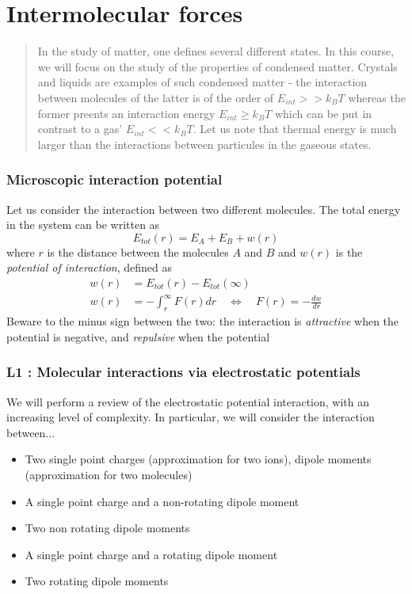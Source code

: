 \documentclass[../phys-f308.tex]{subfiles}
\begin{document}
    \part{Intermolecular forces}
    \begin{abstract}
        In the study of matter, one defines several different states. In this course, we will focus on the study of the properties of condensed matter. Crystals and liquids are examples of such condensed matter - the interaction between molecules of the latter is of the order of $E_{int}>> k_BT$ whereas the former preents an interaction energy $E_{int}\geq k_BT$ which can be put in contrast to a gas' $E_{int}<< k_BT$. Let us note that thermal energy is much larger than the interactions between particules in the gaseous states. 
    \end{abstract}

    \section{Microscopic interaction potential}

    Let us consider the interaction between two different molecules. The total energy in the system can be written as
    \begin{equation}
        E_{tot}(r) = E_A+E_B+w(r)
    \end{equation}
    where $r$ is the distance between the molecules $A$ and $B$ and $w(r)$ is the \emph{potential of interaction}, defined as
    \begin{align}
        w(r) &= E_{tot}(r) - E_{tot}(\infty)\\
        w(r) &= -\int_r^{\infty}F(r)dr \quad \Leftrightarrow \quad F(r) = -\frac{dw}{dr}\label{eq: F dw/dr}
    \end{align}
    Beware to the minus sign between the two: the interaction is \emph{attractive} when the potential is negative, and \emph{repulsive} when the potential   

    \section{L1 : Molecular interactions via electrostatic potentials}

    We will perform a review of the electrostatic potential interaction, with an increasing level of complexity. In particular, we will consider the interaction between...
    \begin{itemize}
        \item Two single point charges (approximation for two ions), dipole moments (approximation for two molecules)
        \item A single point charge and a non-rotating dipole moment
        \item Two non rotating dipole moments
        \item A single point charge and a rotating dipole moment
        \item Two rotating dipole moments
    \end{itemize}
\end{document}
